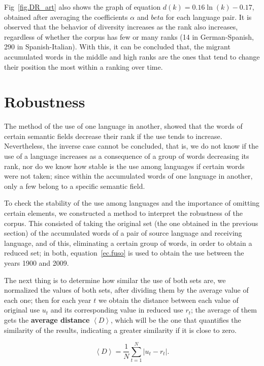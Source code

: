 \documentclass[10pt,letterpaper]{article} %
\begin{document}
Fig~\ref{fig.DR_art} also shows the graph of equation $d(k) = 0.16\ln(k) - 0.17$, obtained after averaging the coefficients $\alpha$ and $beta$ for each language pair. It is observed that the behavior of diversity increases as the rank also increases, regardless of whether the corpus has few or many ranks (14 in German-Spanish, 290 in Spanish-Italian). With this, it can be concluded that, the migrant accumulated words in the middle and high ranks are the ones that tend to change their position the most within a ranking over time.



\section*{Robustness} %

The method of the use of one language in another, showed that the words of certain semantic fields decrease their rank if the use tends to increase. Nevertheless, the inverse case cannot be concluded, that is, we do not know if the use of a language increases as a consequence of a group of words decreasing its rank, nor do we know how stable is the use among languages ​​if certain words were not taken; since within the accumulated words of one language in another, only a few belong to a specific semantic field.

To check the stability of the use among languages and the importance of omitting certain elements, we constructed a method to interpret the robustness of the corpus. This consisted of taking the original set (the one obtained in the previous section) of the accumulated words of a pair of source language and receiving language, and of this, eliminating a certain group of words, in order to obtain a reduced set; in both,  equation~\ref{ec.fuso} is used to obtain the use between the years 1900 and 2009.

The next thing is to determine how similar the use of both sets are, we normalized the values of both sets, after dividing them by the average value of each one; then for each year $t$ we obtain the distance between each value of original use $u_{t}$ and its corresponding value in reduced use $r_{t}$; the average of them gets the \textbf{average distance} $\left\langle D \right\rangle$, which will be the one that quantifies the similarity of the results, indicating a greater similarity if it is close to zero.

\begin{equation}
\left\langle D \right\rangle  = \frac{1}{N}\sum_{t=1}^{N} \left| u_{t} - r_{t} \right|  .
\label{ec.Davg}
\end{equation}
\end{document}
